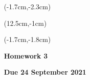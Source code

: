 \documentclass[12pt, oneside]{article}
\begin{document}
\begin{textblock*}{4cm}(-1.7cm,-2.3cm)
\end{textblock*}

\begin{textblock*}{8cm}(12.5cm,-1cm)
\end{textblock*}
\begin{textblock*}{13.5cm}(-1.7cm,-1.8cm)
\end{textblock*}

\vspace{1cm}

\begin{center}
\textbf{\Large Homework 3}

\textbf{Due 24 September 2021}
\end{center}
\end{document}
